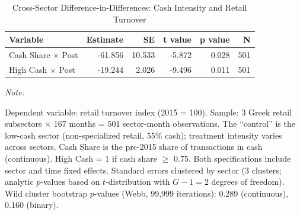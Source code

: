 \begin{table}[!h]
\centering
\caption{\label{tab:tab4}Cross-Sector Difference-in-Differences: Cash Intensity and Retail Turnover}
\centering
\begin{threeparttable}
\begin{tabular}[t]{lrrrrr}
\toprule
Variable & Estimate & SE & t value & p value & N\\
\midrule
Cash Share $\times$ Post & -61.856 & 10.533 & -5.872 & 0.028 & 501\\
High Cash $\times$ Post & -19.244 & 2.026 & -9.496 & 0.011 & 501\\
\bottomrule
\end{tabular}
\begin{tablenotes}
\item \textit{Note: } 
\item Dependent variable: retail turnover index (2015 = 100). Sample: 3 Greek retail subsectors $\times$ 167 months = 501 sector-month observations. The ``control'' is the low-cash sector (non-specialized retail, 55\% cash); treatment intensity varies across sectors. Cash Share is the pre-2015 share of transactions in cash (continuous). High Cash = 1 if cash share $\geq$ 0.75. Both specifications include sector and time fixed effects. Standard errors clustered by sector (3 clusters; analytic $p$-values based on $t$-distribution with $G-1=2$ degrees of freedom). Wild cluster bootstrap $p$-values (Webb, 99{,}999 iterations): 0.289 (continuous), 0.160 (binary).
\end{tablenotes}
\end{threeparttable}
\end{table}
